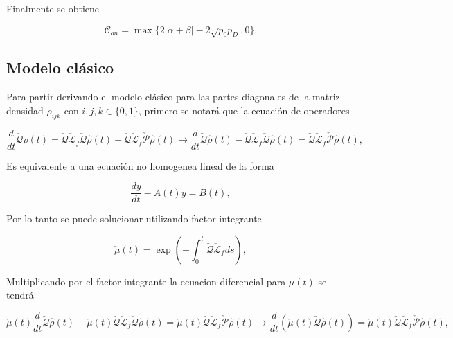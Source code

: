\begin{appendixs}
Finalmente se obtiene

\begin{equation*}
    \mathcal{C}_{on} = \max\{ 2|\alpha+\beta| - 2\sqrt{p_{0}p_{D}},0\}.
\end{equation*}

\label{appendix5final}

\subsection{Modelo clásico}
Para partir derivando el modelo clásico para las partes diagonales de la matriz densidad $\rho_{ijk}$ con $i,j,k \in \{0,1\}$, primero se notará que la ecuación de operadores

\begin{equation*}
    \frac{d}{dt}\check{\mathcal{Q}}\hat{\rho}(t) = \check{\mathcal{Q}}\check{\mathcal{L}}_{f}\check{\mathcal{Q}}\hat{\rho}(t) + \check{\mathcal{Q}}\check{\mathcal{L}}_{f}\check{\mathcal{P}}\hat{\rho}(t) \to \frac{d}{dt}\check{\mathcal{Q}}\hat{\rho}(t) - \check{\mathcal{Q}}\check{\mathcal{L}}_{f}\check{\mathcal{Q}}\hat{\rho}(t) = \check{\mathcal{Q}}\check{\mathcal{L}}_{f}\check{\mathcal{P}}\hat{\rho}(t),
\end{equation*}

Es equivalente a una ecuación no homogenea lineal de la forma

\begin{equation*}
    \frac{dy}{dt} - A(t)y = B(t),
\end{equation*}

Por lo tanto se puede solucionar utilizando factor integrante

\begin{equation*}
    \check{\mu}(t) = \exp\left( - \int_{0}^{t}\check{\mathcal{Q}}\check{\mathcal{L}}_{f}ds \right),
\end{equation*}

Multiplicando por el factor integrante la ecuacion diferencial para $\mu(t)$ se tendrá

\begin{equation*}
    \check{\mu}(t)\frac{d}{dt}\check{\mathcal{Q}}\hat{\rho}(t) - \check{\mu}(t)\check{\mathcal{Q}}\check{\mathcal{L}}_{f}\check{\mathcal{Q}}\hat{\rho}(t) = \check{\mu}(t)\check{\mathcal{Q}}\check{\mathcal{L}}_{f}\check{\mathcal{P}}\hat{\rho}(t) \to \frac{d}{dt}(\check{\mu}(t)\check{\mathcal{Q}}\hat{\rho}(t)) = \check{\mu}(t)\check{\mathcal{Q}}\check{\mathcal{L}}_{f}\check{\mathcal{P}}\hat{\rho}(t) ,
\end{equation*}


\end{appendixs}
